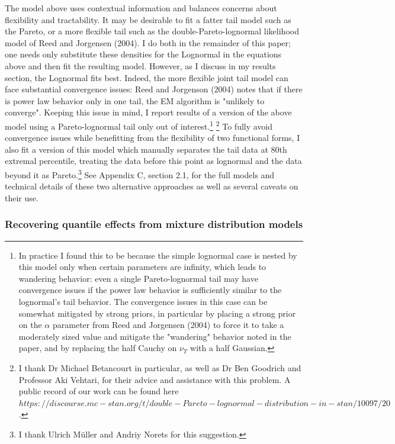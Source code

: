 \documentclass[AER]{AEA}
\begin{document}
The model above uses contextual information and balances concerns about flexibility and tractability. It may be desirable to fit a fatter tail model such as the Pareto, or a more flexible tail such as the double-Pareto-lognormal likelihood model of Reed and Jorgensen (2004). I do both in the remainder of this paper; one needs only substitute these densities for the Lognormal in the equations above and then fit the resulting model. However, as I discuss in my results section, the Lognormal fits best. Indeed, the more flexible joint tail model can face substantial convergence issues: Reed and Jorgenson (2004) notes that if there is power law behavior only in one tail, the EM algorithm is "unlikely to converge". Keeping this issue in mind, I report results of a version of the above model using a Pareto-lognormal tail only out of interest.\footnote{In practice I found this to be because the simple lognormal case is nested by this model only when certain parameters are infinity, which leads to wandering behavior: even a single Pareto-lognormal tail may have convergence issues if the power law behavior is sufficiently similar to the lognormal's tail behavior. The convergence issues in this case can be somewhat mitigated by strong priors, in particular by placing a strong prior on the $\alpha$ parameter from Reed and Jorgensen (2004) to force it to take a moderately sized value and mitigate the "wandering" behavior noted in the paper, and by replacing the half Cauchy on $\nu_{\Upsilon}$ with a half Gaussian.} \footnote{I thank Dr Michael Betancourt in particular, as well as Dr Ben Goodrich and Professor Aki Vehtari, for their advice and assistance with this problem. A public record of our work can be found here ${https://discourse.mc-stan.org/t/double-Pareto-lognormal-distribution-in-stan/10097/20} $.} To fully avoid convergence issues while benefitting from the flexibility of two functional forms, I also fit a version of this model which manually separates the tail data at 80th extremal percentile, treating the data before this point as lognormal and the data beyond it as Pareto.\footnote{I thank Ulrich M{\"u}ller and Andriy Norets for this suggestion.}  See Appendix C, section 2.1, for the full models and technical details of these two alternative approaches as well as several caveats on their use. 

\subsubsection{Recovering quantile effects from mixture distribution models}
\end{document}
